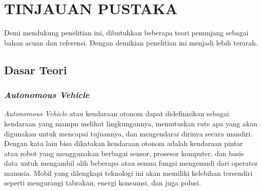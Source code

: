 \chapter{TINJAUAN PUSTAKA}
\label{chap:tinjauanpustaka}


Demi mendukung penelitian ini, dibutuhkan beberapa teori penunjang sebagai bahan acuan dan referensi. Dengan demikian penelitian ini menjadi lebih terarah.

\section{Dasar Teori}
\label{sec:dasarteori}

\subsection{\textit{Autonomous Vehicle}}

\textit{Autonomous Vehicle} atau kendaraan otonom dapat didefinisikan sebagai kendaraan yang mampu melihat lingkungannya, memutuskan rute apa yang akan digunakan untuk mencapai tujuannya, dan mengendarai dirinya secara mandiri. Dengan kata lain bisa dikatakan kendaraan otonom adalah kendaraan pintar atau robot yang menggunakan berbagai sensor, prosesor komputer, dan basis data untuk mengambil alih beberapa atau semua fungsi mengemudi dari operator manusia. Mobil yang dilengkapi teknologi ini akan memiliki kelebihan tersendiri seperti mengurangi tabrakan, energi konsumsi, dan juga polusi.\cite{cit:autonomous_vehicle_future}

